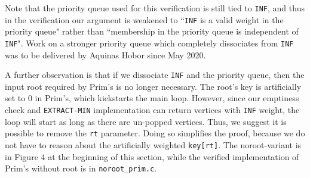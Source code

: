 Note that the priority queue used for this verification is still tied to \texttt{INF}, and thus in the verification our argument is weakened to ``\texttt{INF} is a valid weight in the priority queue" rather than ``membership in the priority queue is independent of \texttt{INF}". Work on a stronger priority queue which completely dissociates from \texttt{INF} was to be delivered by Aquinas Hobor since May 2020.

A further observation is that if we dissociate \texttt{INF} and the priority queue, then the input root required by Prim's is no longer necessary. The root's key is artificially set to 0 in Prim's, which kickstarts the main loop. However, since our emptiness check and \texttt{EXTRACT-MIN} implementation can return vertices with \texttt{INF} weight, the loop will start as long as there are un-popped vertices. Thus, we suggest it is possible to remove the \texttt{rt} parameter. Doing so simplifies the proof, because we do not have to reason about the artificially weighted \texttt{key[rt]}. The noroot-variant is in Figure 4 at the beginning of this section, while the verified implementation of Prim's without root is in \texttt{noroot\_prim.c}. 